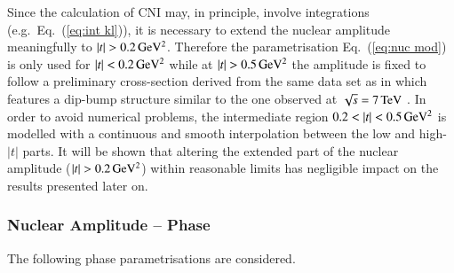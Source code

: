 Since the calculation of CNI may, in principle, involve integrations (e.g.~Eq.~(\ref{eq:int kl})), it is necessary to extend the nuclear amplitude meaningfully to $|t| > 0.2\,{\rm GeV^2}$. Therefore the parametrisation Eq.~(\ref{eq:nuc mod}) is only used for $|t| < 0.2\,{\rm GeV^2}$ while at $|t| > 0.5\,{\rm GeV^2}$ the amplitude is fixed to follow a preliminary cross-section derived from the same data set as in \cite{8tev-90m} which features a dip-bump structure similar to the one observed at $\sqrt{s} = 7\,{\rm TeV}$ \cite{epl95}. In order to avoid numerical problems, the intermediate region $0.2 < |t| < 0.5\,{\rm GeV^2}$ is modelled with a continuous and smooth interpolation between the low and high-$|t|$ parts. It will be shown that altering the extended part of the nuclear amplitude ($|t| > 0.2\,{\rm GeV^2}$) within reasonable limits has negligible impact on the results presented later on.



\subsubsection{Nuclear Amplitude -- Phase}
\label{sec:cni nuclear phase}

The following phase parametrisations are considered.

